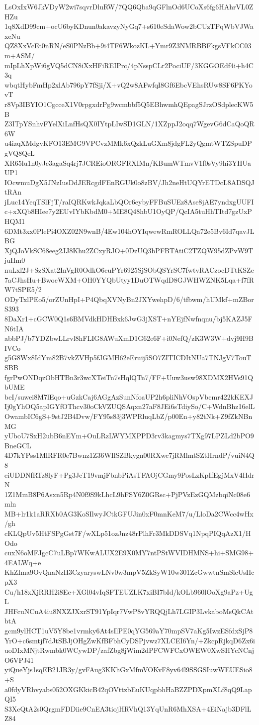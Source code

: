 LsOxIxW6JkVDyW2wi7sqvrDluRW/7QQ6Qba9qGFlnOd6UCoXs6fg6HAhrVL0ZHZu
1q8XdD99cm+ocU6byKDnun0akavzyNyGq7+s610eSdaWow2bCUzTPqWbVJWaxeNu
QZ8XxVcEt0nRN/eS0PNzBb+9i4TF6WkozKL+Ymr9Z3NMRBBFkgsVFkCC03m+ASM/
mIpLhXpWi6gVQ5dCN8iXxHFiREIPrc/4pNsspCLr2PociUF/3KGGOEdf4i+h4C3q
wbqtHybFmHp2xlAb796pY7fSji/X+vQ2w8AFwfqI8Gf6EbcVEhsRUw8SF6PKYovT
r8Vp3IBYIO1CgcceX1V0rpgxdrPg9wcmbbf5Q5EBhwmhQEpagSJrzOSdplecKW5B
Z3ITpYSnhvFYelXiLnfHsQX0IYtpLIwSD1GLN/1XZppJ2oqq7WgevG6dCaQoQR6W
u4izqXMdgvKFO13EMG9VPCvzMMk6xQzkLuGXm8jdgFL2yQgmtWTZSpuDPgVQ8QeL
XR65lu1n0yJc3agaSq4rj7JCREioORGFRXIMn/KBumWTmvV1f0sVy9hi3YHUaUP1
IOcwmuDgX5JNzIusDdJERcgdFEnRGUk0o8zBV/Jh2neHtUQYrETDcL8ADSQJtRAn
jLuc14YeqTSlFjT/raIQRKwkJqkaLbQOr6eybyFFBuSUEz8Ase8jAE7yndxgUUFI
c+xXQb8HIee7y2EUvIYbKbdM0+ME8Q48hbU1OyQP/QcIA5tuHhTItd7gzUxPHQM1
6DMt3xx0PlePi4OXZ02N9wnB/4Ew104hOYIqwewRmROLLQa72e5Bv6Id7qavJLBG
XjQJoVkSC68eeg2JJ8Khu2ZCxyRJO+0DzUQ3bPFBTAtiC2TZQW95dZPvW9TjuHm0
nuLxl2J+SzSXat2InVgR0OdkO6cuPYr6925SjSObQSYrSC7fwtvRACzocDTtKSZe
7aCJhsHu+BwocWXM+OH0YYQbUtyy1DuOTWqdD8GJWHWZNK5Lqa+f7fRW7tSPE5/2
ODyTxlPEo5/orZUnHpI+P4QbqXVNyBn2JXYwehpD/6/tfbwm/hUMkf+mZBorS393
8DaXr1+cGCW0Q1s6BMVdkHDHBxk6JwG3jXST+nYEjfNwfnqnu/bj5KAZJ5FN6tIA
abbPJ/b7YDZbwLLrvl8hFLIG8AWuXmD1G62e6F+i0NefQ/zK3W3W+dvj9H9BIVCo
g5G8Wx8IdYm82B7vkZVHp5fJGMH62eEruij5SO7ZITICDItNUa7TNJgV7TouTSBB
fgrPwONDqzObHTBn3r3wcXTeiTn7sHqlQTn7/FF+Uuw3usw98XDMX2HVs91QbUME
beI/suwei8M7lEqo+uGzkCaj6AGgAzSunNfoaUP2h6pliNhVOspVbcmr422kKEXJ
Ij0gYhOQ5apIGYfOThcv30oCkVZUQSAqxn27aF8JEi6sTdiySo/C+WdnBhz16elL
OwambIC6gS+9stJ2B4Dvw/FY95s83j3WPRluqLbZ/p00En+y82tNk+Z9fZkNBnMG
yUboU7SxH2ubB6nEYm+OuLRzLWYMXPPD3rv3kagmys7TXg97LPZLd2bPO9BneGCL
4D7kYPss1MlRFR0e7Bwnz1Z36WIlSZBkygn00RXwc7jRMlmtSZtHrndP/vuiN4Q8
eiUDDNfRTz8lyF+Pg3JcT19vmjFbnbPiAsTFAOjCGmy9PosLzKpIfEgjMxV4HdrN
1Z1MmB8P6Asxn5Rp4N0f9S9kLhcL9hFSY6Z0GRsc+PjPVzEzGQMzbqiNc08e6mln
MB+lr1k1aRRXb0AG3KoSIlwyJCtkGFUJin0xF0mnKeM7/u/LloDa2CWcc4wHx/gh
cKLQpUv5HtFSPgGst7F/wXLp51ozJnz48rPlhFr3MkDDSVq1NpqPIQqAzX1/HOdo
cuxN6oMFJgcC7uLBp7WKwALUX2E9X0MY7ntPStWVIDHMNS+hi+SMG98+4EALWq+e
KhZIma9OvQnaNzH3CzyaryswLNv0w3mpV5ZkSyW10w301ZcGwwtnSmSlcUsHcpX3
Cu/h18xXjRRH2i8Ee+XGl04vIqSFTEUZLK7xiBI7bId/kOLb960lOoXg9aPz+UgL
JHFcuNCuA4iu8NXZJXxrST91YpIqr7VwP8vYRQQjLh7LGIP3LvkaboMsQkCAtbtA
gcm9ylHCT1uV5Y8be1vrmky6At4sIlPE0qYG569aY70mpSV7aKg5IwzESfdxSjP8
YrO+c6smtjf7dJtSBJjOHgZwKfBFbhCyDSPjvwz7XLCEI6Yn/+ZkcpRjkqD6Zx6i
uoDIxMNjtRwmbk0WCywDP/zafZbg8jWim2dPFCWFCxOWEW0XwSHYcNCnjO6VPJ41
yiQueYjs1sqEB21JR3y/gvFAug3KKhGxMfmVOKvF8yv64l9SSGSIuwWEUESio8+S
a0fdyVRhvyabs052OXGKkicB42qOVttzbEuKUqpbhHaBZZPDXpmXLf8qQ9LapQI5
S3XcQtA2s0QrgmFDDiie9CnEA3tiojHRVhQ13YqUnR6MhXSA+4EiNajb3DFlLZ84
